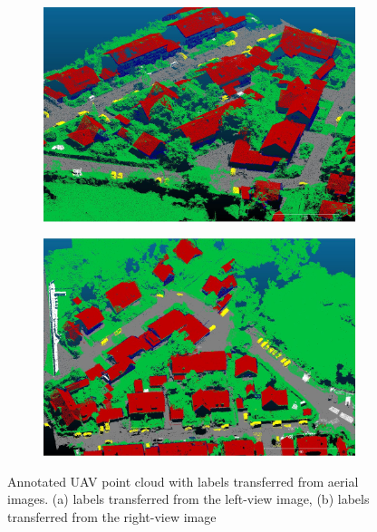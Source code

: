 \begin{figure}[H]
\begin{subfigure}{0.49\columnwidth}
  \centering
  \includegraphics[width=1\linewidth]{fig/eichenau/pc_colored_l.JPG}
  \caption{}

\end{subfigure}
\begin{subfigure}{0.49\columnwidth}
  \centering
  \includegraphics[width=1\linewidth]{fig/eichenau/pc_colored_r.JPG}
  \caption{}


\end{subfigure}
\caption{Annotated UAV point cloud with labels transferred from aerial images. (a) labels transferred from the left-view image, (b) labels transferred from the right-view image}
\label{fig:color_pc}
\end{figure}


